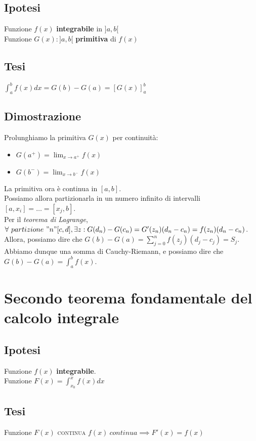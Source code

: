 \documentclass{article}
\begin{document}
\begin{multicols}{2}
    \subsection{Ipotesi}
    Funzione \(f(x)\) \textbf{integrabile} in \(]a, b[\)\\
    Funzione \(G(x) : ]a, b[\) \textbf{primitiva} di \(f(x)\)
\columnbreak
    \subsection{Tesi}
    \(\int_a^b f(x) dx = G(b) - G(a) = [G(x)]^b_a\)
\end{multicols}

\subsection{Dimostrazione}
Prolunghiamo la primitiva \(G(x)\) per continuità:
\begin{itemize}
    \item \(G(a^+) = \lim_{x \to a^+} f(x)\)
    \item \(G(b^-) = \lim_{x \to b^-} f(x)\)
\end{itemize}
La primitiva ora è continua in \([a, b]\).\\
Possiamo allora partizionarla in un numero infinito di intervalli \([a, x_i] = \dots = [x_j, b]\).\\
Per il \textit{teorema di Lagrange}, \(\forall\ partizione\ "n" [c, d], \exists z : G(d_n) - G(c_n) = G'(z_n)(d_n - c_n) = f(z_n)(d_n - c_n)\).\\
Allora, possiamo dire che \(G(b) - G(a) = \sum_{j = 0}^n f(z_j)(d_j - c_j) = S_j\).\\
Abbiamo dunque una somma di Cauchy-Riemann, e possiamo dire che \(G(b) - G(a) = \int_a^b f(x)\).

\newpage

\section{Secondo teorema fondamentale del calcolo integrale}

\begin{multicols}{2}
    \subsection{Ipotesi}
    Funzione \(f(x)\) \textbf{integrabile}.\\
    Funzione \(F(x) = \int_{x_0}^x f(x) dx\)
\columnbreak
    \subsection{Tesi}
    Funzione \(F(x)\) \textsc{continua}
    \(f(x)\ continua \implies F'(x) = f(x)\)
\end{multicols}
\end{document}
